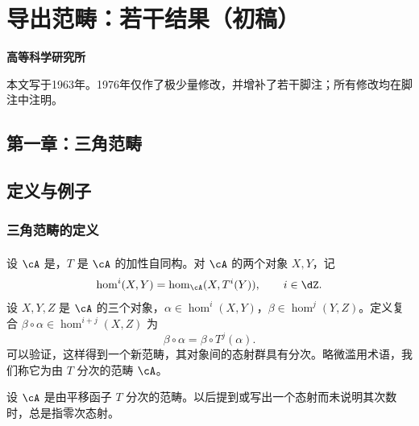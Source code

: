 \chapter{导出范畴：若干结果（初稿）}\label{VIII}
\noindent\textbf{高等科学研究所}

本文写于1963年。1976年仅作了极少量修改，并增补了若干脚注；所有修改均在脚注中注明。

\begingroup
\renewcommand{\thesection}{\S\,\arabic{section}}
\renewcommand{\thesubsection}{\arabic{subsection}}
\renewcommand{\thesubsubsection}{\arabic{subsection}-\arabic{subsubsection}}
\section*{第一章：三角范畴}
\setcounter{section}{0}
\section{定义与例子}\label{VIII:1}
\subsection{三角范畴的定义}\label{VIII:1-1}
\addtocounter{subsubsection}{-1}
\subsubsection{}\label{VIII:1-1-0}
设 $\cA$ 是，$T$ 是 $\cA$ 的加性自同构。对 $\cA$ 的两个对象 $X,Y$，记
\[
 \hom^i(X,Y)=\hom_\cA(X,T^i(Y)),\qquad i\in\dZ.
\]
设 $X,Y,Z$ 是 $\cA$ 的三个对象，$\alpha\in\hom^i(X,Y)$，$\beta\in\hom^j(Y,Z)$。定义复合 $\beta\circ\alpha\in\hom^{i+j}(X,Z)$ 为
\[
 \beta\circ\alpha=\beta\circ T^j(\alpha).
\]
可以验证，这样得到一个新范畴，其对象间的态射群具有分次。略微滥用术语，我们称它为由 $T$ 分次的范畴 $\cA$。

设 $\cA$ 是由平移函子 $T$ 分次的范畴。以后提到或写出一个态射而未说明其次数时，总是指零次态射。

